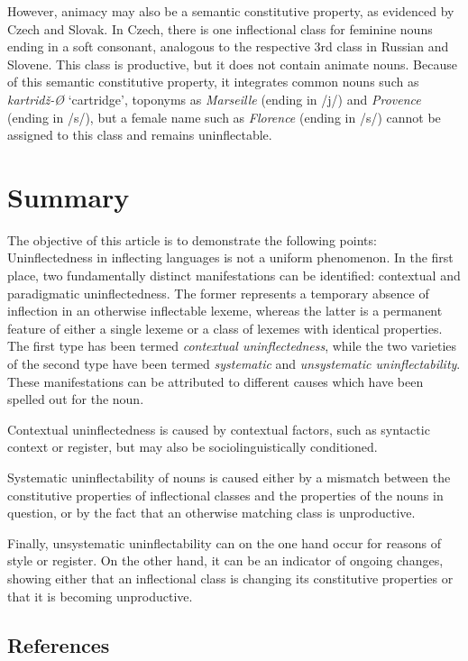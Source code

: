 \documentclass[output=paper]{langscibook}
\begin{document}
However, animacy may also be a semantic constitutive property, as evidenced by Czech and Slovak. In Czech, there is one inflectional class for feminine nouns ending in a soft consonant, analogous to the respective 3rd class in Russian and Slovene. This class is productive, but it does not contain animate nouns. Because of this semantic constitutive property, it integrates common nouns such as \textit{kartridž-Ø} ‘cartridge’, toponyms as \textit{Marseille} (ending in /j/) and \textit{Provence} (ending in /s/), but a female name such as \textit{Florence} (ending in /s/) cannot be assigned to this class and remains uninflectable. 

\section{Summary} %

The objective of this article is to demonstrate the following points: Uninflectedness in inflecting languages is not a uniform phenomenon. In the first place, two fundamentally distinct manifestations can be identified: contextual and paradigmatic uninflectedness. The former represents a temporary absence of inflection in an otherwise inflectable lexeme, whereas the latter is a permanent feature of either a single lexeme or a class of lexemes with identical properties. The first type has been termed \textit{contextual uninflectedness}, while the two varieties of the second type have been termed \textit{systematic} and \textit{unsystematic uninflectability}. These manifestations can be attributed to different causes which have been spelled out for the noun.

Contextual uninflectedness is caused by contextual factors, such as syntactic context or register, but may also be sociolinguistically conditioned. 

Systematic uninflectability of nouns is caused either by a mismatch between the constitutive properties of inflectional classes and the properties of the nouns in question, or by the fact that an otherwise matching class is unproductive.

Finally, unsystematic uninflectability can on the one hand occur for reasons of style or register. On the other hand, it can be an indicator of ongoing changes, showing either that an inflectional class is changing its constitutive properties or that it is becoming unproductive. 

\subsection{References}
\end{document}
